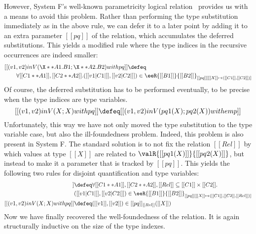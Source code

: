 
However, System F's well-known parametricity logical
relation~\cite{reynolds1983types} provides us with a means to avoid this
problem.  Rather than performing the type substitution immediately as in the
above rule, we can defer it to a later point by adding it to an extra parameter
$[[pq]]$ of the relation, which accumulates the deferred substitutions. This yields a modified rule where the type indices in the recursive occurrences are indeed smaller:
{\small
\begin{align*}
  &[[(v1, v2)  in V(\X ** A1 . B1; \X ** A2 . B2) with pq ]]  \defeq  \\
  &\qquad \forall [[C1 ** A1]], [[C2 ** A2]]. ([[v1 | C1 | ]] ,  [[v2 | C2 |]]) \in \eeR{[[B1]]}{{[[B2]]}}_{[[pq]] [ [[X]] \mapsto ([[C1]], [[C2]])]}
\end{align*}
}%
Of course, the deferred substitution has to be performed eventually, to be precise when the type indices are type variables.
\[
    [[(v1, v2)  in V(X ; X) with pq ]] \defeq [[ (v1, v2) in V(pq1 (X); pq2 (X)) with emp  ]]
\]
Unfortunately, this way we have not only moved the type substitution to the type variable case, but also the ill-foundedness problem. Indeed, this problem is also
present in System F. The standard solution is to not fix the relation $[[Rel]]$ by which values
at type $[[X]]$ are related to $\valR{[[pq1 (X)]]}{[[pq2 (X)]]}$, but instead to make it a parameter that is tracked by $[[pq]]$.
This yields the following two rules for disjoint quantification and type variables:
{\small
\begin{align*}
  [[(v1, v2)  in V(\X ** A1 . B1; \X ** A2 . B2) with pq ]] &\defeq \forall [[C1 ** A1]], [[C2 ** A2]], [[Rel]] \subseteq [[C1]] \times [[C2]]. \\
                                                            & ([[v1 | C1 | ]] ,  [[v2 | C2 |]]) \in \eeR{[[B1]]}{{[[B2]]}}_{[[pq]] [ [[X]] \mapsto ([[C1]], [[C2]], [[Rel]])]} \\
    [[(v1, v2)  in V(X; X) with pq ]] & \defeq ([[v1]], [[v2]]) \in [[pq]]_{[[Rel]]}([[X]])
\end{align*}
}%
Now we have finally recovered the well-foundedness of the relation. It is again
structurally inductive on the size of the type indexes.


